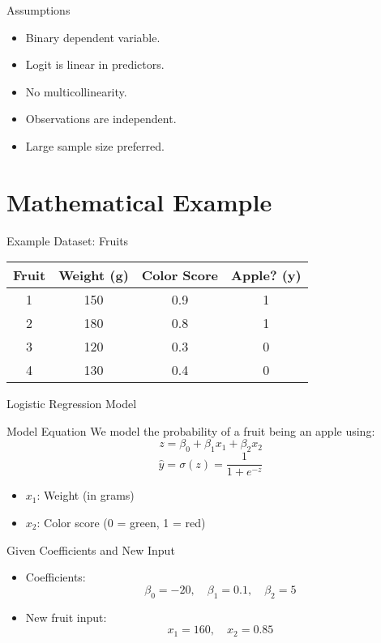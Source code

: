 \documentclass{beamer}
\begin{document}
\begin{frame}{Assumptions}
\begin{itemize}
  \item Binary dependent variable.
  \item Logit is linear in predictors.
  \item No multicollinearity.
  \item Observations are independent.
  \item Large sample size preferred.
\end{itemize}
\end{frame}

\section{Mathematical Example}
\begin{frame}{Example Dataset: Fruits}
\begin{table}[h!]
\centering
\begin{tabular}{@{}cccc@{}}
\toprule
\textbf{Fruit} & \textbf{Weight (g)} & \textbf{Color Score} & \textbf{Apple? (y)} \\
\midrule
1 & 150 & 0.9 & 1 \\
2 & 180 & 0.8 & 1 \\
3 & 120 & 0.3 & 0 \\
4 & 130 & 0.4 & 0 \\
\bottomrule
\end{tabular}
\end{table}
\end{frame}

\begin{frame}{Logistic Regression Model}
\begin{block}{Model Equation}
We model the probability of a fruit being an apple using:
\[
z = \beta_0 + \beta_1 x_1 + \beta_2 x_2
\]
\[
\hat{y} = \sigma(z) = \frac{1}{1 + e^{-z}}
\]
\end{block}
\begin{itemize}
  \item \( x_1 \): Weight (in grams)
  \item \( x_2 \): Color score (0 = green, 1 = red)
\end{itemize}
\end{frame}

\begin{frame}{Given Coefficients and New Input}
\begin{itemize}
  \item Coefficients:
  \[
  \beta_0 = -20,\quad \beta_1 = 0.1,\quad \beta_2 = 5
  \]
  \item New fruit input:
  \[
  x_1 = 160,\quad x_2 = 0.85
  \]
\end{itemize}
\end{frame}
\end{document}
